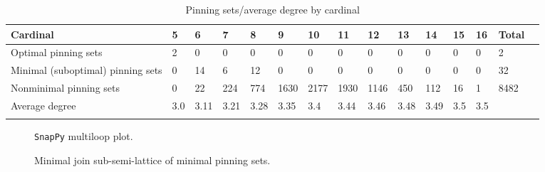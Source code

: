 \documentclass{article}%
\begin{document}
\begin{table}[ht]
	\caption{Pinning sets/average degree by cardinal}
	\centering
	\renewcommand{\arraystretch}{1.5}
	\begin{tabularx}{\textwidth}{lXXXXXXXXXXXXXX}
		\toprule
			Cardinal & 5 & 6 & 7 & 8 & 9 & 10 & 11 & 12 & 13 & 14 & 15 & 16 & Total\\
			\hline
			Optimal pinning sets & 2 & 0 & 0 & 0 & 0 & 0 & 0 & 0 & 0 & 0 & 0 & 0 & 2 \\
			Minimal (suboptimal) pinning sets & 0 & 14 & 6 & 12 & 0 & 0 & 0 & 0 & 0 & 0 & 0 & 0 & 32 \\
			Nonminimal pinning sets & 0 & 22 & 224 & 774 & 1630 & 2177 & 1930 & 1146 & 450 & 112 & 16 & 1 & 8482 \\
			Average degree & 3.0 & 3.11 & 3.21 & 3.28 & 3.35 & 3.4 & 3.44 & 3.46 & 3.48 & 3.49 & 3.5 & 3.5 &  \\
		\bottomrule \\ 
	\end{tabularx}
\end{table}

\begin{multicols}{2}
\begin{figure}[H]
\centering

\caption{\texttt{SnapPy} multiloop plot.}
\label{fig:tex/img/[[5, 16, 6, 1], [4, 11, 5, 12], [15, 24, 16, 17], [6, 24, 7, 23], [1, 23, 2, 22], [12, 22, 13, 21], [3, 20, 4, 21], [10, 28, 11, 25], [17, 28, 18, 27], [14, 7, 15, 8], [2, 14, 3, 13], [19, 25, 20, 26].svg}
\end{figure}
\columnbreak

\begin{figure}[H]
\centering
\scalebox{0.8}{}
\caption{Minimal join sub-semi-lattice of minimal pinning sets.}
\label{fig:tex/img/[[5, 16, 6, 1], [4, 11, 5, 12], [15, 24, 16, 17], [6, 24, 7, 23], [1, 23, 2, 22], [12, 22, 13, 21], [3, 20, 4, 21], [10, 28, 11, 25], [17, 28, 18, 27], [14, 7, 15, 8], [2, 14, 3, 13], [19, 25, 20, 26].pgf}
\end{figure}
\end{multicols}
\end{document}
